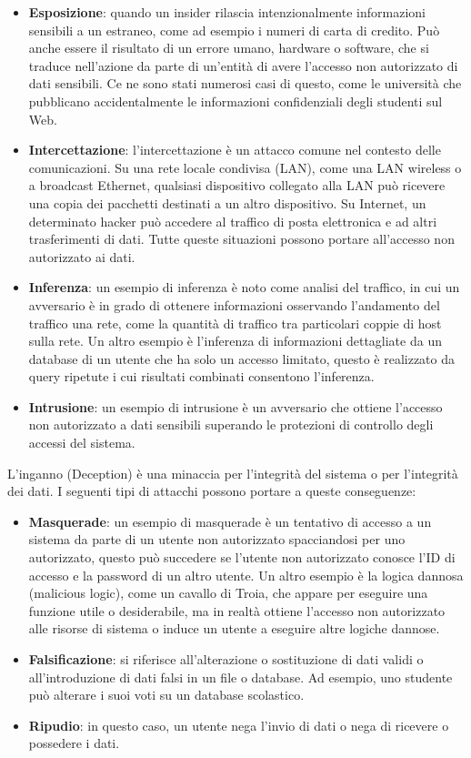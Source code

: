 \begin{itemize}
    \item \textbf{Esposizione}: quando un insider rilascia intenzionalmente informazioni sensibili a un estraneo, come ad esempio i numeri di carta di credito. Può anche essere il risultato di un errore umano, hardware o software, che si traduce nell'azione da parte di un'entità di avere l'accesso non autorizzato di dati sensibili. Ce ne sono stati numerosi casi di questo, come le università che pubblicano accidentalmente le informazioni confidenziali degli studenti sul Web.
    \item \textbf{Intercettazione}: l'intercettazione è un attacco comune nel contesto delle comunicazioni. Su una rete locale condivisa (LAN), come una LAN wireless o a broadcast Ethernet, qualsiasi dispositivo collegato alla LAN può ricevere una copia dei pacchetti destinati a un altro dispositivo. Su Internet, un determinato hacker può accedere al traffico di posta elettronica e ad altri trasferimenti di dati. Tutte queste situazioni possono portare all'accesso non autorizzato ai dati.
    \item \textbf{Inferenza}: un esempio di inferenza è noto come analisi del traffico, in cui un avversario è in grado di ottenere informazioni osservando l'andamento del traffico una rete, come la quantità di traffico tra particolari coppie di host sulla rete. Un altro esempio è l'inferenza di informazioni dettagliate da un database di un utente che ha solo un accesso limitato, questo è realizzato da query ripetute i cui risultati combinati consentono l'inferenza.
    \item \textbf{Intrusione}: un esempio di intrusione è un avversario che ottiene l'accesso non autorizzato a dati sensibili superando le protezioni di controllo degli accessi del sistema.
\end{itemize}

L'inganno (Deception) è una minaccia per l'integrità del sistema o per l'integrità dei dati. I seguenti tipi di attacchi possono portare a queste conseguenze:
\begin{itemize}
    \item \textbf{Masquerade}: un esempio di masquerade è un tentativo di accesso a un sistema  da parte di un utente non autorizzato spacciandosi per uno autorizzato, questo può succedere se l'utente non autorizzato conosce l'ID di accesso e la password di un altro utente. Un altro esempio è la logica dannosa (malicious logic), come un cavallo di Troia, che appare per eseguire una funzione utile o desiderabile, ma in realtà ottiene l'accesso non autorizzato alle risorse di sistema o induce un utente a eseguire altre logiche dannose.
    \item \textbf{Falsificazione}: si riferisce all'alterazione o sostituzione di dati validi o all'introduzione di dati falsi in un file o database. Ad esempio, uno studente può alterare i suoi voti su un database scolastico.
    \item \textbf{Ripudio}: in questo caso, un utente nega l'invio di dati o nega di ricevere o possedere i dati.
\end{itemize}

